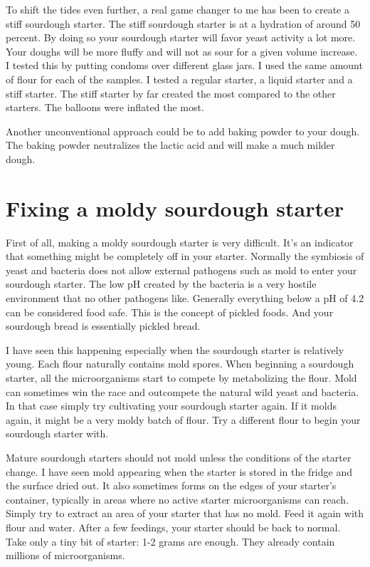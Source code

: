 To shift the tides even further, a real game changer
to me has been to create a stiff sourdough starter. The
stiff sourdough starter is at a hydration of around 50 percent.
By doing so your sourdough starter will favor yeast
activity a lot more. Your doughs will be more fluffy and will
not as sour for a given volume increase. I tested this
by putting condoms over different glass jars. I used
the same amount of flour for each of the samples.
I tested a regular starter, a liquid starter and a stiff
starter. The stiff starter by far created the most 
compared to the other starters. The balloons were inflated
the most. \cite{stiff+starter}

Another unconventional approach could be to add baking
powder to your dough. The baking powder neutralizes the
lactic acid and will make a much milder dough.\cite{baking+powder+reduce-acidity}

\section{Fixing a moldy sourdough starter}

First of all, making a moldy sourdough starter is very difficult.
It's an indicator that something might be completely off in your starter.
Normally the symbiosis of yeast and bacteria does not allow external
pathogens such as mold to enter your sourdough starter.
The low pH created by the bacteria is a very hostile environment
that no other pathogens like. Generally everything below a pH
of 4.2 can be considered food safe\cite{food+safe+ph}. This
is the concept of pickled foods. And your sourdough bread
is essentially pickled bread.

I have seen this happening especially when the sourdough
starter is relatively young. Each flour naturally contains
mold spores. When beginning a sourdough starter, all
the microorganisms start to compete by metabolizing the
flour. Mold can sometimes win the race and outcompete
the natural wild yeast and bacteria. In that case simply
try cultivating your sourdough starter again. If it molds
again, it might be a very moldy batch of flour. Try a different
flour to begin your sourdough starter with.

Mature sourdough starters should not mold unless the conditions
of the starter change. I have seen mold appearing when the starter is stored
in the fridge and the surface dried out. It also sometimes forms on the
edges of your starter's container, typically in areas where no active
starter microorganisms can reach. Simply try to extract an
area of your starter that has no mold. Feed it again with flour and
water. After a few feedings, your starter should be back to normal.
Take only a tiny bit of starter: 1-2 grams are enough. They already
contain millions of microorganisms.

